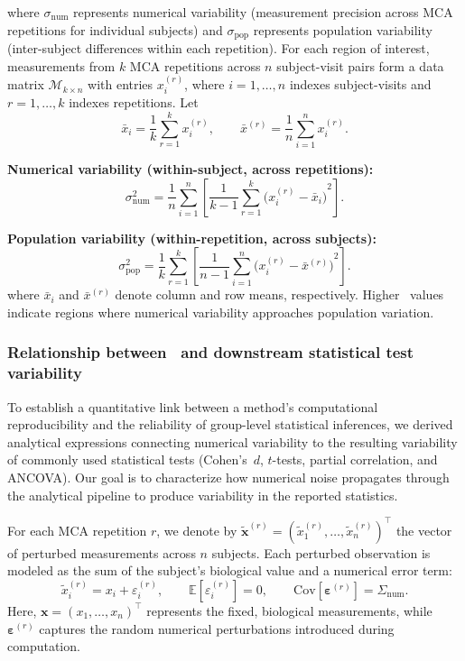 where $\sigma_{\mathrm{num}}$ represents numerical variability (measurement
precision across MCA repetitions for individual subjects) and
$\sigma_{\mathrm{pop}}$ represents population variability (inter-subject
differences within each repetition). For each region of interest, measurements
from $k$ MCA repetitions across $n$ subject-visit pairs form a data matrix
$\mathcal{M}_{k \times n}$ with entries $x_i^{(r)}$, where $i=1,\dots,n$
indexes subject-visits and $r=1,\dots,k$ indexes repetitions. Let
\[
    \bar x_i=\frac{1}{k}\sum_{r=1}^k x_i^{(r)}, \qquad
    \bar x^{(r)}=\frac{1}{n}\sum_{i=1}^n x_i^{(r)}.
\]

\textbf{Numerical variability (within-subject, across repetitions):}
\begin{equation}
    \sigma^2_{\mathrm{num}}
    = \frac{1}{n}\sum_{i=1}^{n}\left[
    \frac{1}{k-1}\sum_{r=1}^{k}{\bigl(x_i^{(r)}-\bar x_i\bigr)}^2
    \right].
    \label{eq:sigma_num}
\end{equation}

\textbf{Population variability (within-repetition, across subjects):}
\begin{equation}
    \sigma^2_{\mathrm{pop}}
    = \frac{1}{k}\sum_{r=1}^{k}\left[
    \frac{1}{n-1}\sum_{i=1}^{n}{\bigl(x_i^{(r)}-\bar x^{(r)}\bigr)}^2
    \right].
    \label{eq:sigma_anat}
\end{equation}
where $\bar{x}_i$ and $\bar{x}^{(r)}$ denote column and row means, respectively.
Higher \npvr\ values indicate regions where numerical variability approaches
population variation.

\subsubsection{Relationship between \npvr~and downstream statistical test
    variability\label{sec:theoretical_derivations}}

To establish a quantitative link between a method's computational
reproducibility and the reliability of group-level statistical inferences, we
derived analytical expressions connecting numerical variability to the
resulting variability of commonly used statistical tests (Cohen's~$d$,
$t$-tests, partial correlation, and ANCOVA). Our goal is to characterize how
numerical noise propagates through the analytical pipeline to produce
variability in the reported statistics.

For each MCA repetition $r$, we denote by $\tilde{\mathbf{x}}^{(r)} =
    {(\tilde{x}_1^{(r)}, \dots, \tilde{x}_n^{(r)})}^\top$ the vector of perturbed
measurements across $n$ subjects. Each perturbed observation is modeled as the
sum of the subject's biological value and a numerical error term:
\begin{equation*}
    \tilde{x}_i^{(r)} = x_i + \varepsilon_i^{(r)},
    \qquad
    \mathbb{E}[\varepsilon_i^{(r)}] = 0,
    \qquad
    \mathrm{Cov}[\boldsymbol{\varepsilon}^{(r)}] = \Sigma_{\mathrm{num}}.
    \label{eq:model_noise}
\end{equation*}
Here, $\mathbf{x} = {(x_1, \dots, x_n)}^\top$ represents the fixed, biological
measurements, while $\boldsymbol{\varepsilon}^{(r)}$ captures the random
numerical perturbations introduced during computation.

